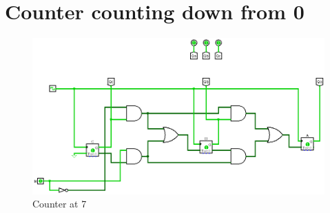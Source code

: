 \documentclass[12pt]{article}
\begin{document}
\section{Counter counting down from 0}
\begin{center}
    \begin{figure}[ht]
        \centering
        \includegraphics[scale=0.50]{seven.png}
        \caption{Counter at 7}
    \end{figure}
\end{center}
\end{document}
